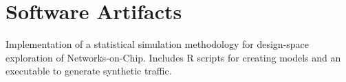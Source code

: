 \section{\sc Software Artifacts}

{
  Implementation of a statistical simulation methodology for design-space exploration of Networks-on-Chip.
  Includes R scripts for creating models and an executable to generate synthetic traffic.
}
